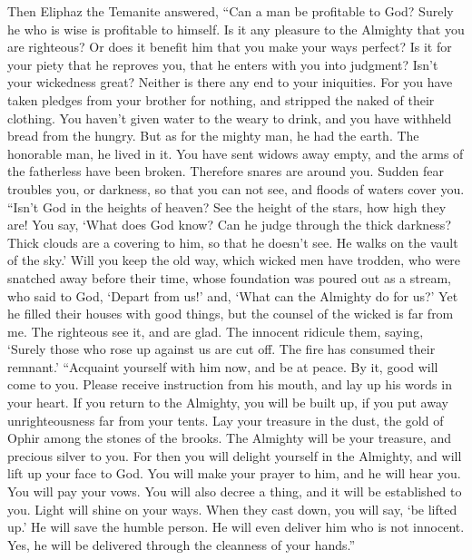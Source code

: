  Then Eliphaz the Temanite answered,  ``Can
a man be profitable to God? Surely he who is wise is profitable to
himself.  Is it any pleasure to the Almighty that you are
righteous? Or does it benefit him that you make your ways perfect?
 Is it for your piety that he reproves you, that he enters
with you into judgment?  Isn't your wickedness great?
Neither is there any end to your iniquities.  For you have
taken pledges from your brother for nothing, and stripped the naked of
their clothing.  You haven't given water to the weary to
drink, and you have withheld bread from the hungry.  But
as for the mighty man, he had the earth. The honorable man, he lived in
it.  You have sent widows away empty, and the arms of the
fatherless have been broken.  Therefore snares are around
you. Sudden fear troubles you,  or darkness, so that you
can not see, and floods of waters cover you.  ``Isn't God
in the heights of heaven? See the height of the stars, how high they
are!  You say, `What does God know? Can he judge through
the thick darkness?  Thick clouds are a covering to him,
so that he doesn't see. He walks on the vault of the sky.'
 Will you keep the old way, which wicked men have
trodden,  who were snatched away before their time, whose
foundation was poured out as a stream,  who said to God,
`Depart from us!' and, `What can the Almighty do for us?'
 Yet he filled their houses with good things, but the
counsel of the wicked is far from me.  The righteous see
it, and are glad. The innocent ridicule them,  saying,
`Surely those who rose up against us are cut off. The fire has consumed
their remnant.'  ``Acquaint yourself with him now, and be
at peace. By it, good will come to you.  Please receive
instruction from his mouth, and lay up his words in your heart.
 If you return to the Almighty, you will be built up, if
you put away unrighteousness far from your tents.  Lay
your treasure in the dust, the gold of Ophir among the stones of the
brooks.  The Almighty will be your treasure, and precious
silver to you.  For then you will delight yourself in the
Almighty, and will lift up your face to God.  You will
make your prayer to him, and he will hear you. You will pay your vows.
 You will also decree a thing, and it will be established
to you. Light will shine on your ways.  When they cast
down, you will say, `be lifted up.' He will save the humble person.
 He will even deliver him who is not innocent. Yes, he
will be delivered through the cleanness of your hands.''

